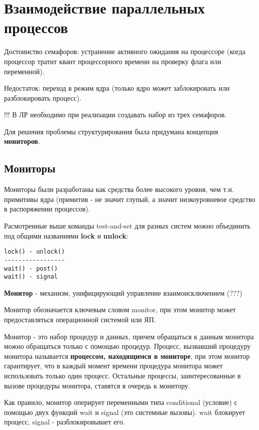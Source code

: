 \documentclass[a4paper, 14pt]{report}
\begin{document}
	\section*{Взаимодействие параллельных процессов}
	
	Достоинство семафоров: устранение активного ожидания на процессоре (когда процессор тратит квант процессорного времени на проверку флага или переменной).
	
	Недостаток: переход в режим ядра (только ядро может заблокировать или разблокировать процесс).
	
	!!! В ЛР необходимо при реализации создавать набор из трех семафоров.
	
	Для решения проблемы структурирования была придумана концепция {\bf мониторов}.
	
	\subsection*{Мониторы}
	
	Мониторы были разработаны как средства более высокого уровня, чем т.н. примитивы ядра (примитив - не значит глупый, а значит низкоуровневое средство в распоряжении процессов).
	
	Расмотренные выше команды test-and-set для разных систем можно объединить под общими названиями \textbf{lock} и \textbf{unlock}:
	
	\begin{lstlisting}
lock() - unlock()
-----------------
wait() - post()
wait() - signal
	\end{lstlisting}

	\textbf{Монитор} - механизм, унифицирующий управление взаимоисключением (???)
	
	Монитор обозначается ключевым словом monitor, при этом монитор может предоставляться операционной системой или ЯП.
	
	Монитор - это набор процедур и данных, причем обращаться к данным монитора можно обращаться только с помощью процедур. Процесс, вызвавший процедуру монитора называется \textbf{процессом, находящимся в мониторе}, при этом монитор гарантирует, что в каждый момент времени процедура монитора может использовать только один процесс. Остальные процессы, заинтересованные в вызове процедуры монитора, ставятся в очередь к монитору.
	
	Как правило, монитор оперирует переменными типа conditional (условие) с помощью двух функций wait и signal (это системные вызовы). wait блокирует процесс, signal - разблокировывает его.
	
\end{document}
